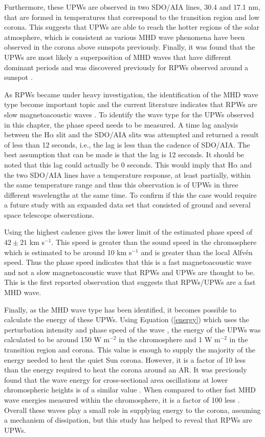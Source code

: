 	Furthermore, these UPWs are observed in two SDO/AIA lines, 30.4 and 17.1 nm, that are formed in temperatures that correspond to the transition region and low corona.
	This suggests that UPWs are able to reach the hotter regions of the solar atmosphere, which is consistent as various MHD wave phenomena have been observed in the corona above sunspots previously. 
	Finally, it was found that the UPWs are most likely a superposition of MHD waves that have different dominant periods and was discovered previously for RPWs observed around a sunspot \citep{Jess2013}. 
	
	As RPWs became under heavy investigation, the identification of the MHD wave type become important topic and the current literature indicates that RPWs are slow magnetoacoustic waves \citep{Bloomfiel2008}.
	To identify the wave type for the UPWs observed in this chapter, the phase speed needs to be measured.
	A time lag analysis between the H$\alpha$ slit and the SDO/AIA slits was attempted and returned a result of less than 12 seconds, i.e., the lag is less than the cadence of SDO/AIA.
	The best assumption that can be made is that the lag is 12 seconds.
	It should be noted that this lag could actually be 0 seconds. 
	This would imply that H$\alpha$ and the two SDO/AIA lines have a temperature response, at least partially, within the same temperature range and thus this observation is of UPWs in three different wavelengths at the same time. 
	To confirm if this the case would require a future study with an expanded data set that consisted of ground and several space telescope observations.
	
	Using the highest cadence gives the lower limit of the estimated phase speed of $42\pm21$ km s$^{-1}$.
	This speed is greater than the sound speed in the chromosphere which is estimated to be around 10 km s$^{-1}$ \citep{Morton2012} and is greater than the local Alfv\'en speed.
	Thus the phase speed indicates that this is a fast magnetoacoustic wave and not a slow magnetoacoustic wave that RPWs and UPWs are thought to be.
    This is the first reported observation that suggests that RPWs/UPWs are a fast MHD wave.
    
    Finally, as the MHD wave type has been identified, it becomes possible to calculate the energy of these UPWs.
    Using Equation (\ref{energy}) which uses the perturbation intensity and phase speed of the wave \citep{Kitagawa2010}, the energy of the UPWs was calculated to be around 150 W m$^{-2}$ in the chromosphere and 1 W m$^{-2}$ in the transition region and corona.
    This value is enough to supply the majority of the energy needed to heat the quiet Sun corona.
    However, it is a factor of 10 less than the energy required to heat the corona around an AR.
    It was previously found that the wave energy for cross-sectional area oscillations at lower chromospheric heights is of a similar value  \citep{0004-637X-806-1-132}. 
    When compared to other fast MHD wave energies measured within the chromosphere, it is a factor of 100 less \citep{Morton2012}. 
    Overall these waves play a small role in supplying energy to the corona, assuming a mechanism of dissipation, but this study has helped to reveal that RPWs are UPWs.
    
